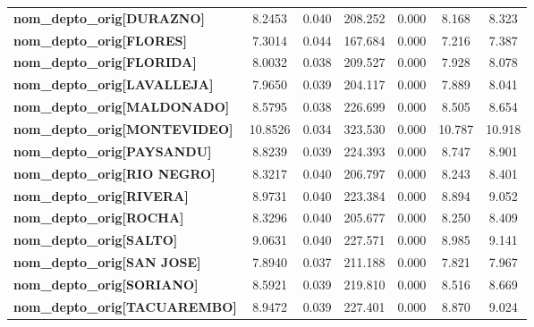 \begin{center}
\begin{tabular}{lcccccc}
\textbf{nom\_depto\_orig[DURAZNO]}         &       8.2453  &        0.040     &   208.252  &         0.000        &        8.168    &        8.323     \\
\textbf{nom\_depto\_orig[FLORES]}          &       7.3014  &        0.044     &   167.684  &         0.000        &        7.216    &        7.387     \\
\textbf{nom\_depto\_orig[FLORIDA]}         &       8.0032  &        0.038     &   209.527  &         0.000        &        7.928    &        8.078     \\
\textbf{nom\_depto\_orig[LAVALLEJA]}       &       7.9650  &        0.039     &   204.117  &         0.000        &        7.889    &        8.041     \\
\textbf{nom\_depto\_orig[MALDONADO]}       &       8.5795  &        0.038     &   226.699  &         0.000        &        8.505    &        8.654     \\
\textbf{nom\_depto\_orig[MONTEVIDEO]}      &      10.8526  &        0.034     &   323.530  &         0.000        &       10.787    &       10.918     \\
\textbf{nom\_depto\_orig[PAYSANDU]}        &       8.8239  &        0.039     &   224.393  &         0.000        &        8.747    &        8.901     \\
\textbf{nom\_depto\_orig[RIO NEGRO]}       &       8.3217  &        0.040     &   206.797  &         0.000        &        8.243    &        8.401     \\
\textbf{nom\_depto\_orig[RIVERA]}          &       8.9731  &        0.040     &   223.384  &         0.000        &        8.894    &        9.052     \\
\textbf{nom\_depto\_orig[ROCHA]}           &       8.3296  &        0.040     &   205.677  &         0.000        &        8.250    &        8.409     \\
\textbf{nom\_depto\_orig[SALTO]}           &       9.0631  &        0.040     &   227.571  &         0.000        &        8.985    &        9.141     \\
\textbf{nom\_depto\_orig[SAN JOSE]}        &       7.8940  &        0.037     &   211.188  &         0.000        &        7.821    &        7.967     \\
\textbf{nom\_depto\_orig[SORIANO]}         &       8.5921  &        0.039     &   219.810  &         0.000        &        8.516    &        8.669     \\
\textbf{nom\_depto\_orig[TACUAREMBO]}      &       8.9472  &        0.039     &   227.401  &         0.000        &        8.870    &        9.024     \\

\end{tabular}
\end{center}
